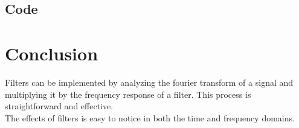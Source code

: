 \documentclass[11pt]{article}
\begin{document}
\subsection{Code}



\section{Conclusion}

Filters can be implemented by analyzing the fourier transform of 
a signal and multiplying it by the frequency response of a filter.
This process is straightforward and effective.\\

The effects of filters is easy to notice in both the time and frequency domains.
\end{document}
